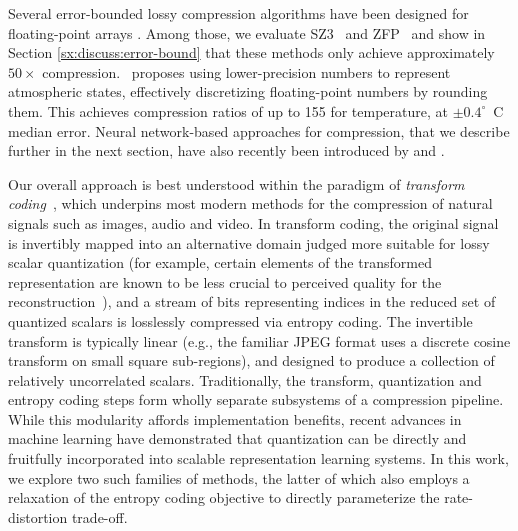 Several error-bounded lossy compression algorithms have been designed for floating-point arrays \citep{sz3_algo,sz3_framework,zfpy_2014,tthresh_2020,sperr_2023}. Among those, we evaluate SZ3~\citep{sz3_algo,sz3_framework} and ZFP~\citep{zfpy_2014} and show in Section \ref{sx:discuss:error-bound} that these methods only achieve approximately $50\times$ compression.
\citet{klower2021compressing}~proposes using lower-precision numbers to represent atmospheric states, effectively discretizing floating-point numbers by rounding them. This achieves compression ratios of up to 155 for temperature, at $\pm 0.4^\circ$~C median error. Neural network-based approaches for compression, that we describe further in the next section, have also recently been introduced by \citet{huang2022compressing} and \citet{han2024cra5}. 


Our overall approach is best understood within the paradigm of \emph{transform coding}~\citep{goyal2001theoretical}, which underpins most modern methods for the compression of natural signals such as images, audio and video.
In transform coding, the original signal is invertibly mapped into an alternative domain judged more suitable for lossy scalar quantization (for example, certain elements of the transformed representation are known to be less crucial to perceived quality for the reconstruction~\citep{wallace1992jpeg}), and a stream of bits representing indices in the reduced set of quantized scalars is losslessly compressed via entropy coding.
The invertible transform is typically linear (e.g., the familiar JPEG format uses a discrete cosine transform on small square sub-regions), and designed to produce a collection of relatively uncorrelated scalars.
Traditionally, the transform, quantization and entropy coding steps form wholly separate subsystems of a compression pipeline.
While this modularity affords implementation benefits, recent advances in machine learning have demonstrated that quantization can be directly and fruitfully incorporated into scalable representation learning systems.
In this work, we explore two such families of methods, the latter of which also employs a relaxation of the entropy coding objective to directly parameterize the rate-distortion trade-off.

